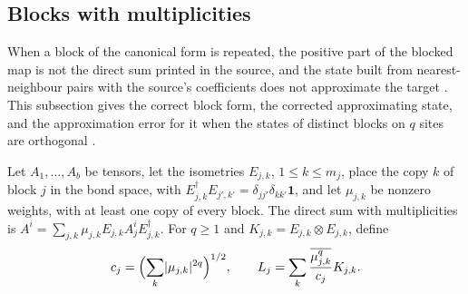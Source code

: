 
\subsection{Blocks with multiplicities}\label{sec:ldp_repeated_blocks}

When a block of the canonical form is repeated, the positive part of the
blocked map is not the direct sum printed in the source, and the state built
from nearest-neighbour pairs with the source's coefficients does not approximate
the target
\cite{gap:mswc24_multiplicity_fixed_point}. This subsection gives the correct
block form, the corrected approximating state, and the approximation error
for it when the states of distinct blocks on $q$ sites are orthogonal
\cite{gap:mswc24_repeated_block_corrected_state}.

\begin{definition}
    \label{def:ldp_repeated_block_sum}
    \leanok
    Let $A_1,\dots,A_b$ be tensors, let the isometries $E_{j,k}$,
    $1\leq k\leq m_j$, place the copy $k$ of block $j$ in the bond space, with
    $E_{j,k}^\dagger E_{j',k'}=\delta_{jj'}\delta_{kk'}\mathbf 1$, and let
    $\mu_{j,k}$ be nonzero weights, with at least one copy of every block. The
    direct sum with multiplicities is
    $A^i=\sum_{j,k}\mu_{j,k}E_{j,k}A_j^iE_{j,k}^\dagger$. For $q\geq1$ and
    $K_{j,k}=E_{j,k}\otimes E_{j,k}$, define
    \begin{align*}
        c_j=\Bigl(\sum_k\lvert\mu_{j,k}\rvert^{2q}\Bigr)^{1/2},\qquad
        L_j=\sum_k\frac{\overline{\mu_{j,k}^q}}{c_j}K_{j,k}.
    \end{align*}
\end{definition}

